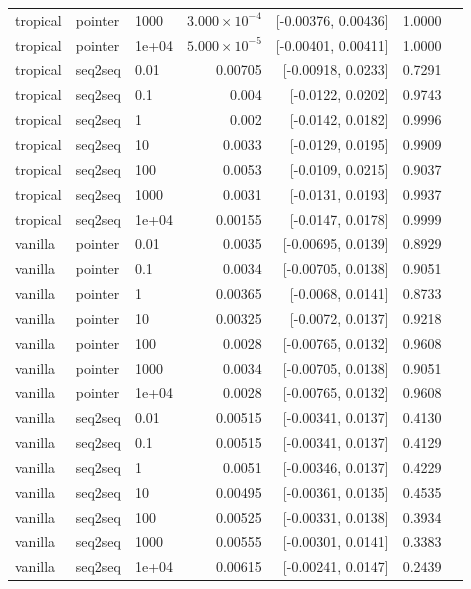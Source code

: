 \documentclass[10pt]{article}
\begin{document}
{\begin{longtable}{lllrrrl}
tropical & pointer & 1000 & $3.000\times10^{-4}$ & [-0.00376, 0.00436] & 1.0000 & \\
tropical & pointer & 1e+04 & $5.000\times10^{-5}$ & [-0.00401, 0.00411] & 1.0000 & \\
tropical & seq2seq & 0.01 & 0.00705 & [-0.00918, 0.0233] & 0.7291 & \\
tropical & seq2seq & 0.1 & 0.004 & [-0.0122, 0.0202] & 0.9743 & \\
tropical & seq2seq & 1 & 0.002 & [-0.0142, 0.0182] & 0.9996 & \\
tropical & seq2seq & 10 & 0.0033 & [-0.0129, 0.0195] & 0.9909 & \\
tropical & seq2seq & 100 & 0.0053 & [-0.0109, 0.0215] & 0.9037 & \\
tropical & seq2seq & 1000 & 0.0031 & [-0.0131, 0.0193] & 0.9937 & \\
tropical & seq2seq & 1e+04 & 0.00155 & [-0.0147, 0.0178] & 0.9999 & \\
vanilla & pointer & 0.01 & 0.0035 & [-0.00695, 0.0139] & 0.8929 & \\
vanilla & pointer & 0.1 & 0.0034 & [-0.00705, 0.0138] & 0.9051 & \\
vanilla & pointer & 1 & 0.00365 & [-0.0068, 0.0141] & 0.8733 & \\
vanilla & pointer & 10 & 0.00325 & [-0.0072, 0.0137] & 0.9218 & \\
vanilla & pointer & 100 & 0.0028 & [-0.00765, 0.0132] & 0.9608 & \\
vanilla & pointer & 1000 & 0.0034 & [-0.00705, 0.0138] & 0.9051 & \\
vanilla & pointer & 1e+04 & 0.0028 & [-0.00765, 0.0132] & 0.9608 & \\
vanilla & seq2seq & 0.01 & 0.00515 & [-0.00341, 0.0137] & 0.4130 & \\
vanilla & seq2seq & 0.1 & 0.00515 & [-0.00341, 0.0137] & 0.4129 & \\
vanilla & seq2seq & 1 & 0.0051 & [-0.00346, 0.0137] & 0.4229 & \\
vanilla & seq2seq & 10 & 0.00495 & [-0.00361, 0.0135] & 0.4535 & \\
vanilla & seq2seq & 100 & 0.00525 & [-0.00331, 0.0138] & 0.3934 & \\
vanilla & seq2seq & 1000 & 0.00555 & [-0.00301, 0.0141] & 0.3383 & \\
vanilla & seq2seq & 1e+04 & 0.00615 & [-0.00241, 0.0147] & 0.2439 & \\
\bottomrule
\end{longtable}
}
\end{document}
